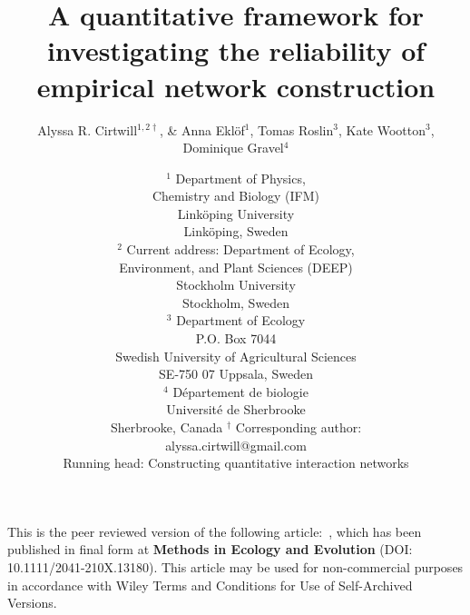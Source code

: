 \documentclass[12pt]{article}
\title{A quantitative framework for investigating the reliability of empirical network construction}
\author{Alyssa R. Cirtwill$^{1,2\dagger}$, \&  Anna Ekl\"{o}f$^{1}$, Tomas Roslin$^{3}$, Kate Wootton$^{3}$, Dominique Gravel$^{4}$}
\date{
\small$^1$ Department of Physics,\\
Chemistry and Biology (IFM)\\ 
Link\"{o}ping University\\
Link\"{o}ping, Sweden\\
\medskip
\small$^2$ Current address: Department of Ecology,\\
Environment, and Plant Sciences (DEEP)\\
Stockholm University\\
Stockholm, Sweden\\
\medskip
\small$^3$ Department of Ecology\\ 
P.O. Box 7044\\ 
Swedish University of Agricultural Sciences \\ 
SE-750 07 Uppsala, Sweden\\
\medskip
\small$^4$ D\'{e}partement de biologie\\ 
Universit\'{e} de Sherbrooke\\ 
Sherbrooke, Canada
\medskip
\small$^\dagger$ Corresponding author:\\
alyssa.cirtwill@gmail.com\\
\medskip
\medskip
\normalsize Running head: Constructing quantitative interaction networks
}
\begin{document}
 
\maketitle 
\raggedright
\setlength{\parindent}{15pt} 

\vspace{-.2in}


This is the peer reviewed version of the following article:~\citet{Cirtwill2019}, which has been published in final form at \textbf{Methods in Ecology and Evolution} (DOI: 10.1111/2041-210X.13180). This article may be used for non-commercial purposes in accordance with Wiley Terms and Conditions for Use of Self-Archived Versions.





\newpage
\end{document}

